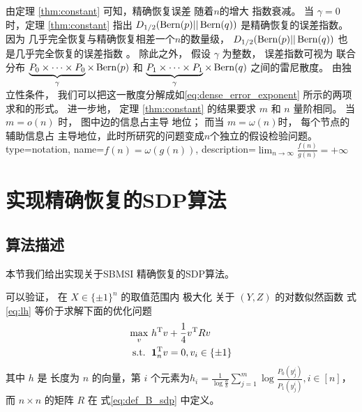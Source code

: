 由定理 \ref{thm:constant} 可知，精确恢复误差
随着$n$的增大
指数衰减。
当 $\gamma=0$ 时，定理 \ref{thm:constant} 指出
$D_{1/2}(\operatorname{Bern}(p)||\operatorname{Bern}(q))$
是精确恢复的误差指数。
因为
几乎完全恢复与精确恢复相差一个$n$的数量级，
$D_{1/2}(\operatorname{Bern}(p)||\operatorname{Bern}(q))$ 也是几乎完全恢复的误差指数
\cite{zhang2016}。
除此之外， 假设 $\gamma$ 为整数，
误差指数可视为 
联合分布
$\underbrace{P_0\times \dots \times P_0}_{\gamma} \times \Bern(p)$
和 $\underbrace{P_1\times \dots \times P_1}_{\gamma} \times \Bern(q)$
之间的雷尼散度。
由独立性条件，
我们可以把这一散度分解成如\eqref{eq:dense_error_exponent}
所示的两项求和的形式。
进一步地， 定理 \ref{thm:constant} 
的结果要求
$m$ 和 $n$ 量阶相同。
当 $m=o(n)$ 时，
图中边的信息占主导
地位；
而当 $m=\omega(n)$时，
每个节点的辅助信息占
主导地位，此时所研究的问题变成$n$个独立的假设检验问题。
{
  type=notation,
  name={$f(n)=\omega(g(n))$},
  description={$\lim_{n\to \infty} \frac{f(n)}{g(n)} = +\infty$}
}

\section{实现精确恢复的SDP算法}\label{sec:sdp_exact}
\subsection{算法描述}
本节我们给出实现关于SBMSI 精确恢复的SDP算法。

可以验证， 在 $X\in\{\pm 1\}^n$ 的取值范围内
极大化 关于
$(Y,Z)$ 的对数似然函数 式 \eqref{eq:lh} 等价于求解下面的优化问题
\begin{align}
    \max_{v}\  & h^{\mathrm{T}} v + \frac{1}{4}v^{\mathrm{T}} R v \notag \\
    \textrm{s.t. }\, & \mathbf{1}_n^{\mathrm{T}} v = 0, v_i \in \{\pm 1 \}
    \label{eq:matrix_mle}
\end{align}
其中 $h$ 是 长度为 $n$ 的向量，第 $i$ 个元素为$h_i = \frac{1}{\log \frac{a}{b}}\sum_{j=1}^m \log \frac{P_0(y^i_{j})}{P_1(y^i_{j})}, i\in [n]$，
而  $n\times n $ 的矩阵 $R$ 在 式\eqref{eq:def_B_sdp} 中定义。

